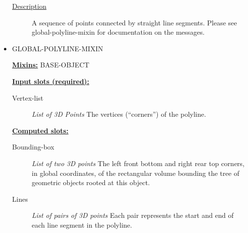 \documentclass [11pt]{book}
\begin{document}
\begin{itemize}
\begin{description}

\item [
\underline{Description}]


A sequence of points connected by straight line segments. Please see
global-polyline-mixin for documentation on the messages.



\end{description}









\item {}GLOBAL-POLYLINE-MIXIN


\textbf{
\underline{Mixins:}} BASE-OBJECT





\begin{description}

\end{description}








\textbf{
\underline{Input slots (required):}}

\begin{description}

\item [Vertex-list]
\emph{List of 3D Points} The vertices (``corners'') of the polyline.


\end{description}






\textbf{
\underline{Computed slots:}}

\begin{description}

\item [Bounding-box]
\emph{List of two 3D points} The left front bottom and right rear top corners, in global coordinates,
of the rectangular volume bounding the tree of geometric objects rooted at this object.


\item [Lines]
\emph{List of pairs of 3D points} Each pair represents the start and end of each line segment in the polyline.



\end{description}
\end{itemize}
\end{document}
